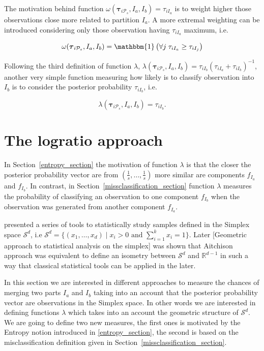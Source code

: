 \documentclass[10pt, a4paper]{article}
\newcommand{\m}[1]{\boldsymbol{#1}}
\begin{document}
\begin{spacing}{1.9}
The motivation behind function $\omega(\m\tau_{i \mathcal{P}_s},  I_a,  I_b) = \tau_{iI_a}$ is to weight higher those observations close more related to partition $I_a$. A more extremal weighting can be introduced considering only those observation having $ \tau_{iI_a}$ maximum, i.e.

\[
\omega(\m\tau_{i \mathcal{P}_s},  I_a,  I_b) = \mathbbm{1}\left( \forall j\; \tau_{i I_{a}} \geq \tau_{iI_j} \right)
\]

Following the third definition of function $\lambda$, $\lambda(\m\tau_{i \mathcal{P}_s},  I_a,  I_b) = \tau_{iI_b} (\tau_{iI_a} + \tau_{iI_b})^{-1}$, another very simple function measuring how likely is to classify observation into $I_b$ is to consider the posterior probability $\tau_{i I_{b}}$, i.e.

\[
\lambda(\m\tau_{i \mathcal{P}_s},  I_a,  I_b) = \tau_{iI_b}.
\]

\section{The logratio approach}

In Section~\ref{entropy_section} the motivation of function $\lambda$ is that the closer the posterior probability vector are from $(\frac{1}{s}, \dots, \frac{1}{s})$ more similar are components $f_{I_a}$ and $f_{I_b}$. In contrast, in Section~\ref{missclassification_section} function $\lambda$ measures  the probability of classifying an observation to one component $f_{I_b}$ when the observation was generated from another component $f_{I_a}$.

\cite{aitchison1986statistical} presented a series of tools to statistically study samples defined in the Simplex space $\mathcal{S}^d$, i.e $\mathcal{S}^d = \{ (x_1,\dots, x_d) \;|\; x_i > 0 \text{ and } \sum_{i=1}^k x_i = 1 \}$. Later [Geometric approach to statistical analysis on the simplex] was shown that Aitchison approach was equivalent to define an isometry between $\mathcal{S}^d$ and $\mathbb{R}^{d-1}$ in such a way that classical statistical tools can be applied in the later. 

In this section we are interested in different approaches to measure the chances of merging two parts $I_a$ and $I_b$ taking into an account that the posterior probability vector are observations in the Simplex space. In other words we are interested in defining functions $\lambda$ which takes into an account the geometric structure of $\mathcal{S}^d$. We are going to define two new measures, the first ones is motivated by the Entropy notion introduced in \ref{entropy_section}, the second is based on the misclassification definition given in Section~\ref{missclassification_section}.



\end{spacing}
\end{document}
